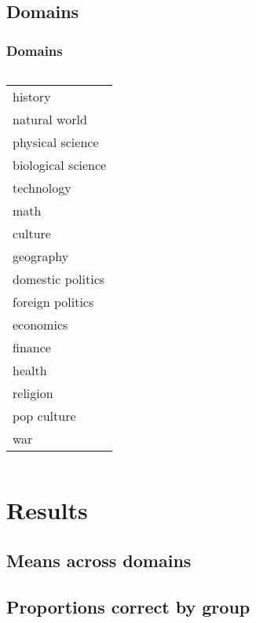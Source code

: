 \documentclass[pdf]{beamer}
\begin{document}
\subsection{Domains}
\begin{frame}
\frametitle{Domains}
  \begin{columns}
      \begin{tabular} {l}  %
        \hline   %
        history			                   \\
        natural world                  \\
        physical science               \\
        biological science             \\
        technology                     \\
        math                           \\
        culture                        \\
        geography                      \\
        domestic politics              \\
        foreign politics               \\
        economics                      \\
        finance                        \\
        health                         \\
        religion                       \\
        pop culture                    \\
        war                            \\
        \hline  %
        \end{tabular}
  \end{columns}
\end{frame}


\section{Results}
\subsection{Means across domains}
\subsection{Proportions correct by group}
\end{document}
